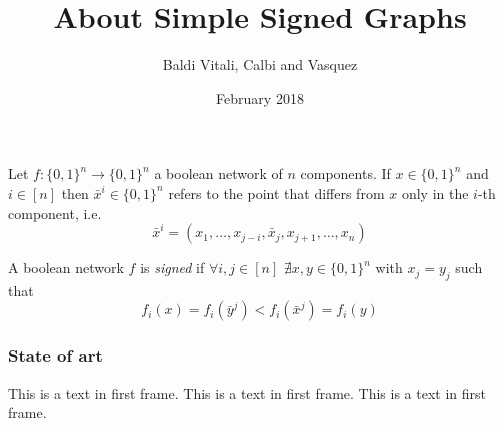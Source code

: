 \documentclass{beamer}
\title{About Simple Signed Graphs}
\author{Baldi Vitali, Calbi and Vasquez}
\institute{Université de Nice Sophia-Antipolis}
\date{February 2018}
\begin{document}
	
\frame{\titlepage}

\begin{frame}
\begin{definition}[$\bar{x}^i$]
	Let $f:\{0,1\}^n \rightarrow \{0,1\}^n$ a boolean network of $n$ components. If $x \in \{0,1\}^n$ and $i \in [n]$ then $\bar{x}^i \in \{0,1\}^n$ refers to the point that differs from $x$ only in the $i$-th component, i.e.
	\[
	\bar{x}^i = (x_1, \dots, x_{j-i}, \bar{x}_j, x_{j+1}, \dots, x_n)
	\]
\end{definition}
\begin{definition}
	A boolean network $f$ is \textit{signed} if $\forall i,j \in [n]$ $\nexists x,y \in \{0,1\}^n$ with $x_j = y_j$ such that 
	\[
	f_i(x) = f_i(\bar{y}^j) < f_i(\bar{x}^j) = f_i(y)
	\]
\end{definition}
\end{frame}

\begin{frame}
\end{frame}

\begin{frame}
\frametitle{State of art}
This is a text in first frame. This is a text in first frame. This is a text in first frame.
\end{frame}
\end{document}
